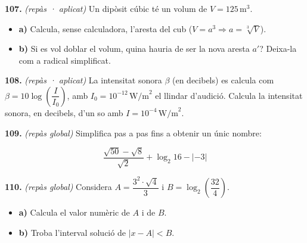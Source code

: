 \documentclass[13pt,a4paper]{extarticle}
\begin{document}
\par\noindent\begin{minipage}{\linewidth}
\textbf{107.} \emph{(repàs · aplicat)} Un dipòsit cúbic té un volum de $V=125\,\text{m}^3$.\par

\begin{itemize}[leftmargin=0pt,itemsep=3pt,topsep=3pt,parsep=0pt,label={}]
\item \textbf{a)} Calcula, sense calculadora, l'aresta del cub ($V=a^3 \Rightarrow a=\sqrt[3]{V}$).
\item \textbf{b)} Si es vol doblar el volum, quina hauria de ser la nova aresta $a'$? Deixa-la com a radical simplificat.
\end{itemize}
\end{minipage}\par\vspace{1.6mm}
\par\noindent\begin{minipage}{\linewidth}
\textbf{108.} \emph{(repàs · aplicat)} La intensitat sonora $\beta$ (en decibels) es calcula com $\beta=10\log\left(\dfrac{I}{I_0}\right)$, amb $I_0=10^{-12}\,\text{W/m}^2$ el llindar d'audició. Calcula la intensitat sonora, en decibels, d'un so amb $I=10^{-4}\,\text{W/m}^2$.\par
\end{minipage}\par\vspace{1.6mm}
\par\noindent\begin{minipage}{\linewidth}
\textbf{109.} \emph{(repàs global)} Simplifica pas a pas fins a obtenir un únic nombre:\par

$$\dfrac{\sqrt{50}-\sqrt{8}}{\sqrt2} + \log_2 16 - |{-3}|$$\par
\end{minipage}\par\vspace{1.6mm}
\par\noindent\begin{minipage}{\linewidth}
\textbf{110.} \emph{(repàs global)} Considera $A=\dfrac{3^2\cdot\sqrt4}{3}$ i $B=\log_2\left(\dfrac{32}{4}\right)$.\par

\begin{itemize}[leftmargin=0pt,itemsep=3pt,topsep=3pt,parsep=0pt,label={}]
\item \textbf{a)} Calcula el valor numèric de $A$ i de $B$.
\item \textbf{b)} Troba l'interval solució de $|x-A|<B$.
\end{itemize}
\end{minipage}\par\vspace{1.6mm}
\end{document}
